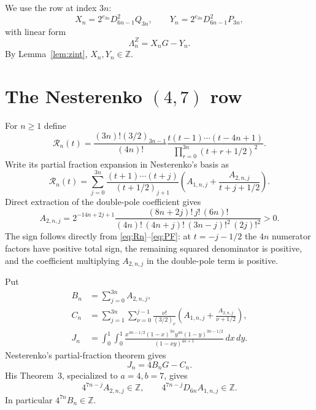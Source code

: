 \documentclass[11pt]{article}
\theoremstyle{definition}
\theoremstyle{remark}
\newcommand{\Z}{\mathbb Z}
\begin{document}
We use the row at index $3n$:
\begin{equation}\label{eq:zrow}
X_n=2^{e_{3n}}D_{6n-1}^2Q_{3n},\qquad
Y_n=2^{e_{3n}}D_{6n-1}^2P_{3n},
\end{equation}
with linear form
\[
\Lambda_n^Z=X_nG-Y_n.
\]
By Lemma~\ref{lem:zint}, $X_n,Y_n\in\Z$.

\section{The Nesterenko \texorpdfstring{$(4,7)$}{(4,7)} row}
For $n\ge1$ define
\begin{equation}\label{eq:Rn}
\mathcal R_n(t)=
\frac{(3n)!(3/2)_{3n-1}}{(4n)!}
\frac{t(t-1)\cdots(t-4n+1)}
{\prod_{r=0}^{3n}(t+r+1/2)^2}.
\end{equation}
Write its partial fraction expansion in Nesterenko's basis as
\begin{equation}\label{eq:PF}
\mathcal R_n(t)=\sum_{j=0}^{3n}
\frac{(t+1)\cdots(t+j)}{(t+1/2)_{j+1}}
\left(A_{1,n,j}+\frac{A_{2,n,j}}{t+j+1/2}\right).
\end{equation}
Direct extraction of the double-pole coefficient gives
\begin{equation}\label{eq:A2}
A_{2,n,j}=2^{-14n+2j+1}
\frac{(8n+2j)!\,j!\,(6n)!}
{(4n)!\,(4n+j)!\,(3n-j)!^2\,(2j)!^2}>0.
\end{equation}
The sign follows directly from \eqref{eq:Rn}--\eqref{eq:PF}: at $t=-j-1/2$ the $4n$ numerator factors have positive total sign, the remaining squared denominator is positive, and the coefficient multiplying $A_{2,n,j}$ in the double-pole term is positive.

Put
\begin{align}
B_n&=\sum_{j=0}^{3n}A_{2,n,j},\label{eq:Bdef}\\
C_n&=\sum_{j=1}^{3n}\sum_{\nu=0}^{j-1}
\frac{\nu!}{(3/2)_\nu}
\left(A_{1,n,j}+\frac{A_{2,n,j}}{\nu+1/2}\right),\label{eq:Cdef}\\
J_n&=\int_0^1\!\int_0^1
\frac{x^{4n-1/2}(1-x)^{3n}y^{4n}(1-y)^{3n-1/2}}
{(1-xy)^{4n+1}}\,dx\,dy.\label{eq:Jdef}
\end{align}
Nesterenko's partial-fraction theorem gives \cite{Nesterenko2016}
\begin{equation}\label{eq:Nidentity}
J_n=4B_nG-C_n.
\end{equation}
His Theorem~3, specialized to $a=4,b=7$, gives
\begin{equation}\label{eq:Ncoeffint}
4^{7n-j}A_{2,n,j}\in\Z,
\qquad
4^{7n-j}D_{6n}A_{1,n,j}\in\Z.
\end{equation}
In particular $4^{7n}B_n\in\Z$.
\end{document}
